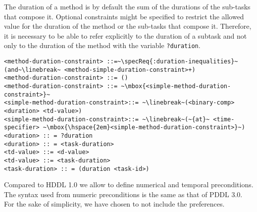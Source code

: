 \documentclass[letterpaper]{article} %
\begin{document}
%
%
The duration of a method is by default the sum of the durations of the sub-tasks that compose it. Optional constraints might be specified to restrict the allowed value for the
duration of the method or the sub-tasks that compose it. Therefore, it is necessary to be able to refer explicitly to the duration of a subtask and not only to the duration of the method with the variable {\tt ?duration}.

\begin{lstlisting}[firstnumber=last, escapechar=~]
<method-duration-constraint> ::=~\specReq{:duration-inequalities}~ (and~\linebreak~ <method-simple-duration-constraint>+)
<method-duration-constraint> ::= ()
<method-duration-constraint> ::= ~\mbox{<simple-method-duration-constraint>}~
<simple-method-duration-constraint>::= ~\linebreak~(<binary-comp> <duration> <td-value>)
<simple-method-duration-constraint>::= ~\linebreak~(~{at}~ <time-specifier> ~\mbox{\hspace{2em}<simple-method-duration-constraint>}~)
<duration> :: = ?duration
<duration> :: = <task-duration>
<td-value> ::= <d-value>
<td-value> ::= <task-duration>
<task-duration> :: = (duration <task-id>)
\end{lstlisting}

%
%
\noindent Compared to HDDL 1.0 we allow to define numerical and temporal preconditions. The syntax used from numeric preconditions is the same as that of PDDL 3.0. For the sake of simplicity, we have chosen to not include the preferences.
\end{document}
